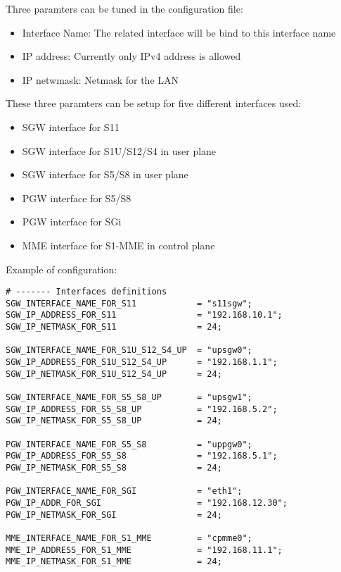 \documentclass[a4paper,oneside]{report}
\begin{document}
Three paramters can be tuned in the configuration file:
\begin{itemize}
 \item Interface Name: The related interface will be bind to this interface name
 \item IP address: Currently only IPv4 address is allowed
 \item IP netwmask: Netmask for the LAN
\end{itemize}
These three paramters can be setup for five different interfaces used:
\begin{itemize}
 \item SGW interface for S11
 \item SGW interface for S1U/S12/S4 in user plane
 \item SGW interface for S5/S8 in user plane
 \item PGW interface for S5/S8
 \item PGW interface for SGi
 \item MME interface for S1-MME in control plane
\end{itemize}
Example of configuration:
\begin{lstlisting}
# ------- Interfaces definitions
SGW_INTERFACE_NAME_FOR_S11            = "s11sgw";
SGW_IP_ADDRESS_FOR_S11                = "192.168.10.1";
SGW_IP_NETMASK_FOR_S11                = 24;

SGW_INTERFACE_NAME_FOR_S1U_S12_S4_UP  = "upsgw0";
SGW_IP_ADDRESS_FOR_S1U_S12_S4_UP      = "192.168.1.1";
SGW_IP_NETMASK_FOR_S1U_S12_S4_UP      = 24;

SGW_INTERFACE_NAME_FOR_S5_S8_UP       = "upsgw1";
SGW_IP_ADDRESS_FOR_S5_S8_UP           = "192.168.5.2";
SGW_IP_NETMASK_FOR_S5_S8_UP           = 24;

PGW_INTERFACE_NAME_FOR_S5_S8          = "uppgw0";
PGW_IP_ADDRESS_FOR_S5_S8              = "192.168.5.1";
PGW_IP_NETMASK_FOR_S5_S8              = 24;

PGW_INTERFACE_NAME_FOR_SGI            = "eth1";
PGW_IP_ADDR_FOR_SGI                   = "192.168.12.30";
PGW_IP_NETMASK_FOR_SGI                = 24;

MME_INTERFACE_NAME_FOR_S1_MME         = "cpmme0";
MME_IP_ADDRESS_FOR_S1_MME             = "192.168.11.1";
MME_IP_NETMASK_FOR_S1_MME             = 24;
\end{lstlisting}
\end{document}
